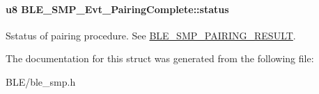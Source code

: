 \paragraph[{\texorpdfstring{status}{status}}]{\setlength{\rightskip}{0pt plus 5cm}u8 B\+L\+E\+\_\+\+S\+M\+P\+\_\+\+Evt\+\_\+\+Pairing\+Complete\+::status}\hypertarget{struct_b_l_e___s_m_p___evt___pairing_complete_a25a4d48871960c99a4693dee0fa598d8}{}\label{struct_b_l_e___s_m_p___evt___pairing_complete_a25a4d48871960c99a4693dee0fa598d8}
Sstatus of pairing procedure. See \hyperlink{group___b_l_e___s_m_p___p_a_i_r_i_n_g___r_e_s_u_l_t}{B\+L\+E\+\_\+\+S\+M\+P\+\_\+\+P\+A\+I\+R\+I\+N\+G\+\_\+\+R\+E\+S\+U\+LT}. 

The documentation for this struct was generated from the following file\+:\begin{DoxyCompactItemize}
\item 
B\+L\+E/ble\+\_\+smp.\+h\end{DoxyCompactItemize}
